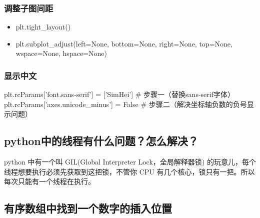 \subsubsection{调整子图间距}
\begin{itemize}
	\item plt.tight\_layout()
	\item plt.subplot\_adjust(left=None, bottom=None, right=None, top=None, wspace=None, hspace=None)
\end{itemize}

\subsubsection{显示中文}
\begin{python}
	plt.rcParams['font.sans-serif'] = ['SimHei'] # 步骤一（替换sans-serif字体）  
	plt.rcParams['axes.unicode_minus'] = False  # 步骤二（解决坐标轴负数的负号显示问题）
\end{python}

\subsection{python中的线程有什么问题？怎么解决？}
python 中有一个叫 GIL(Global Interpreter Lock，全局解释器锁) 的玩意儿，每个线程想要执行必须先获取到这把锁，不管你 CPU 有几个核心，锁只有一把。所以每次只能有一个线程在执行。

\subsection{有序数组中找到一个数字的插入位置}
 



